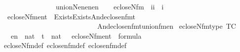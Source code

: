 \begin{isabellebody}
\ \ \ \ \ \ \ \ \ \ \ \ \ \ \ \ union{\isacharparenleft}{\kern0pt}N{\isacharcomma}{\kern0pt}en{}{\isacharcomma}{\kern0pt}en{}{\isacharcomma}{\kern0pt}en{\isacharparenright}{\kern0pt}{\isachardoublequoteclose}\isanewline
\isanewline
{}\isamarkupfalse%
\ \isanewline
\ \ ecloseN{\isacharunderscore}{\kern0pt}fm\ {\isacharcolon}{\kern0pt}{\isacharcolon}{\kern0pt}\ {\isachardoublequoteopen}{\isacharbrackleft}{\kern0pt}i{\isacharcomma}{\kern0pt}i{\isacharbrackright}{\kern0pt}\ {\isasymRightarrow}\ i{\isachardoublequoteclose}\ \isanewline
\ \ {\isachardoublequoteopen}ecloseN{\isacharunderscore}{\kern0pt}fm{\isacharparenleft}{\kern0pt}en{\isacharcomma}{\kern0pt}t{\isacharparenright}{\kern0pt}\ {\isasymequiv}\ Exists{\isacharparenleft}{\kern0pt}Exists{\isacharparenleft}{\kern0pt}And{\isacharparenleft}{\kern0pt}eclose{\isacharunderscore}{\kern0pt}n{}{\isacharunderscore}{\kern0pt}fm{\isacharparenleft}{\kern0pt}{}{\isacharcomma}{\kern0pt}t{\isacharhash}{\kern0pt}{\isacharplus}{\kern0pt}{}{\isacharparenright}{\kern0pt}{\isacharcomma}{\kern0pt}\isanewline
\ \ \ \ \ \ \ \ \ \ \ \ \ \ \ \ \ \ \ \ \ \ \ \ \ \ \ \ And{\isacharparenleft}{\kern0pt}eclose{\isacharunderscore}{\kern0pt}n{}{\isacharunderscore}{\kern0pt}fm{\isacharparenleft}{\kern0pt}{}{\isacharcomma}{\kern0pt}t{\isacharhash}{\kern0pt}{\isacharplus}{\kern0pt}{}{\isacharparenright}{\kern0pt}{\isacharcomma}{\kern0pt}union{\isacharunderscore}{\kern0pt}fm{\isacharparenleft}{\kern0pt}{}{\isacharcomma}{\kern0pt}{}{\isacharcomma}{\kern0pt}en{\isacharhash}{\kern0pt}{\isacharplus}{\kern0pt}{}{\isacharparenright}{\kern0pt}{\isacharparenright}{\kern0pt}{\isacharparenright}{\kern0pt}{\isacharparenright}{\kern0pt}{\isacharparenright}{\kern0pt}{\isachardoublequoteclose}\isanewline
{}\isamarkupfalse%
\ ecloseN{\isacharunderscore}{\kern0pt}fm{\isacharunderscore}{\kern0pt}type\ {\isacharbrackleft}{\kern0pt}TC{\isacharbrackright}{\kern0pt}\ {\isacharcolon}{\kern0pt}\isanewline
\ \ {\isachardoublequoteopen}{\isasymlbrakk}\ en\ {\isasymin}\ nat\ {\isacharsemicolon}{\kern0pt}\ t\ {\isasymin}\ nat\ {\isasymrbrakk}\ {\isasymLongrightarrow}\ ecloseN{\isacharunderscore}{\kern0pt}fm{\isacharparenleft}{\kern0pt}en{\isacharcomma}{\kern0pt}t{\isacharparenright}{\kern0pt}\ {\isasymin}\ formula{\isachardoublequoteclose}\isanewline
%
\isadelimproof
\ \ %
\endisadelimproof
%
\isatagproof
{}\isamarkupfalse%
\ ecloseN{\isacharunderscore}{\kern0pt}fm{\isacharunderscore}{\kern0pt}def\ eclose{\isacharunderscore}{\kern0pt}n{}{\isacharunderscore}{\kern0pt}fm{\isacharunderscore}{\kern0pt}def\ eclose{\isacharunderscore}{\kern0pt}n{}{\isacharunderscore}{\kern0pt}fm{\isacharunderscore}{\kern0pt}def\ \isamarkupfalse%

\end{isabellebody}
